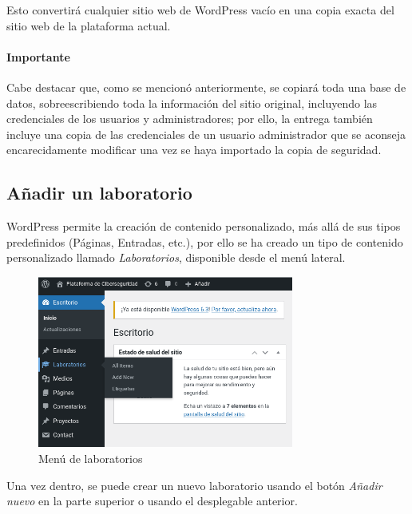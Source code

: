                 Esto convertirá cualquier sitio web de WordPress vacío en una copia exacta del sitio web de la plataforma actual.
                
                \paragraph{Importante}
                
                    Cabe destacar que, como se mencionó anteriormente, se copiará toda una base de datos, sobreescribiendo toda la información del sitio original, incluyendo las credenciales de los usuarios y administradores; por ello, la entrega también incluye una copia de las credenciales de un usuario administrador que se aconseja encarecidamente modificar una vez se haya importado la copia de seguridad.

        \subsection{Añadir un laboratorio}

            WordPress permite la creación de contenido personalizado, más allá de sus tipos predefinidos (Páginas, Entradas, etc.), por ello se ha creado un tipo de contenido personalizado llamado \textit{Laboratorios}, disponible desde el menú lateral.

            \begin{figure}[!htbp]
                \centering

                \includegraphics[width=0.75\textwidth]{images/Capturas/localhost/laboratorios.png}
                \caption{Menú de laboratorios}
                \label{fig:laboratorios}
            \end{figure}

            Una vez dentro, se puede crear un nuevo laboratorio usando el botón \textit{Añadir nuevo} en la parte superior o usando el desplegable anterior.

